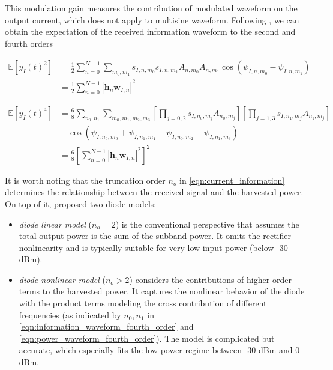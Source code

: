 This modulation gain measures the contribution of modulated waveform on the output current, which does not apply to multisine waveform. Following \cite{Clerckx2018}, we can obtain the expectation of the received information waveform to the second and fourth orders

\begin{align}\label{eqn:information_waveform_second_order}
  \mathbb{E}\left[ {{y_I}{{(t)}^2}} \right] &= \frac{1}{2}\sum\limits_{n = 0}^{N - 1} {\sum\limits_{{m_0},{m_1}} {{s_{I,n,{m_0}}}} } {s_{I,n,{m_1}}}{A_{n,{m_0}}}{A_{n,{m_1}}}\cos \left( {{\psi _{I,n,{m_0}}} - {\psi _{I,n,{m_1}}}} \right) \\
   &= \frac{1}{2}\sum\limits_{n = 0}^{N - 1} {{{\left| {{{\mathbf{h}}_n}{{\mathbf{w}}_{I,n}}} \right|}^2}}
\end{align}

\begin{align}\label{eqn:information_waveform_fourth_order}
  \mathbb{E}\left[ {{y_I}{{(t)}^4}} \right] &= \frac{6}{8}\sum\limits_{{n_0},{n_1}} {\sum\limits_{{m_0},{m_1},{m_2},{m_3}} {\left[ {\prod\limits_{j = 0,2} {{s_{I,{n_0},{m_j}}}{A_{{n_0},{m_j}}}} } \right]\left[ {\prod\limits_{j = 1,3} {{s_{I,{n_1},{m_j}}}{A_{{n_1},{m_j}}}} } \right]} } \nonumber \\
   &\quad \cos \left( {{\psi _{I,{n_0},{m_0}}} + {\psi _{I,{n_1},{m_1}}} - {\psi _{I,{n_0},{m_2}}} - {\psi _{I,{n_1},{m_3}}}} \right) \\
   &= \frac{6}{8}{\left[ {\sum\limits_{n = 0}^{N - 1} {{{\left| {{{\mathbf{h}}_n}{{\mathbf{w}}_{I,n}}} \right|}^2}} } \right]^2} \label{eqn:waveform_end}
\end{align}

It is worth noting that the truncation order ${n_o}$ in \eqref{eqn:current_information} determines the relationship between the received signal and the harvested power. On top of it, \cite{Clerckx2016} proposed two diode models:

\begin{itemize}
  \item \textit{diode linear model} (${n_o} = 2$) is the conventional perspective that assumes the total output power is the sum of the subband power. It omits the rectifier nonlinearity and is typically suitable for very low input power (below -30 dBm).
  \item \textit{diode nonlinear model} (${n_o} > 2$) considers the contributions of higher-order terms to the harvested power. It captures the nonlinear behavior of the diode with the product terms
      modeling the cross contribution of different frequencies (as indicated by ${{n_0},{n_1}}$ in \eqref{eqn:information_waveform_fourth_order} and \eqref{eqn:power_waveform_fourth_order}). The model is complicated but accurate, which especially fits the low power regime between -30 dBm and 0 dBm.
\end{itemize}

